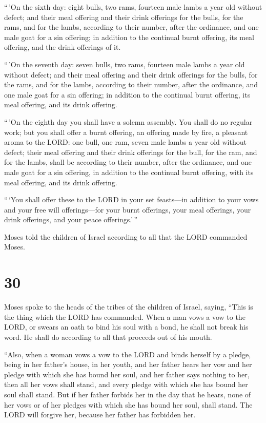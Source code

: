  ``\,'On the sixth day: eight bulls, two rams, fourteen
male lambs a year old without defect;  and their meal
offering and their drink offerings for the bulls, for the rams, and for
the lambs, according to their number, after the ordinance,
 and one male goat for a sin offering; in addition to the
continual burnt offering, its meal offering, and the drink offerings of
it.

 ``\,'On the seventh day: seven bulls, two rams, fourteen
male lambs a year old without defect;  and their meal
offering and their drink offerings for the bulls, for the rams, and for
the lambs, according to their number, after the ordinance,
 and one male goat for a sin offering; in addition to the
continual burnt offering, its meal offering, and its drink offering.

 ``\,'On the eighth day you shall have a solemn assembly.
You shall do no regular work;  but you shall offer a
burnt offering, an offering made by fire, a pleasant aroma to the LORD:
one bull, one ram, seven male lambs a year old without defect;
 their meal offering and their drink offerings for the
bull, for the ram, and for the lambs, shall be according to their
number, after the ordinance,  and one male goat for a sin
offering, in addition to the continual burnt offering, with its meal
offering, and its drink offering.

 ``\,`You shall offer these to the LORD in your set
feasts---in addition to your vows and your free will offerings---for
your burnt offerings, your meal offerings, your drink offerings, and
your peace offerings.'\,''

 Moses told the children of Israel according to all that
the LORD commanded Moses.

\hypertarget{section-29}{%
\section{30}\label{section-29}}

 Moses spoke to the heads of the tribes of the children of
Israel, saying, ``This is the thing which the LORD has commanded.
 When a man vows a vow to the LORD, or swears an oath to
bind his soul with a bond, he shall not break his word. He shall do
according to all that proceeds out of his mouth.

 ``Also, when a woman vows a vow to the LORD and binds
herself by a pledge, being in her father's house, in her youth,
 and her father hears her vow and her pledge with which
she has bound her soul, and her father says nothing to her, then all her
vows shall stand, and every pledge with which she has bound her soul
shall stand.  But if her father forbids her in the day
that he hears, none of her vows or of her pledges with which she has
bound her soul, shall stand. The LORD will forgive her, because her
father has forbidden her.

